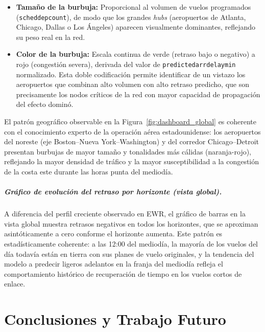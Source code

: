 \documentclass[12pt,oneside,a4paper]{report}
\renewcommand{\_}{\textunderscore\allowbreak}
\begin{document}
\begin{itemize}
    \item \textbf{Tamaño de la burbuja:} Proporcional al volumen de vuelos programados (\texttt{sched\_dep\_count}), de modo que los grandes \textit{hubs} (aeropuertos de Atlanta, Chicago, Dallas o Los Ángeles) aparecen visualmente dominantes, reflejando su peso real en la red.
    \item \textbf{Color de la burbuja:} Escala continua de verde (retraso bajo o negativo) a rojo (congestión severa), derivada del valor de \texttt{predicted\_arr\_delay\_min} normalizado. Esta doble codificación permite identificar de un vistazo los aeropuertos que combinan alto volumen con alto retraso predicho, que son precisamente los nodos críticos de la red con mayor capacidad de propagación del efecto dominó.
\end{itemize}

El patrón geográfico observable en la Figura~\ref{fig:dashboard_global} es coherente con el conocimiento experto de la operación aérea estadounidense: los aeropuertos del noreste (eje Boston--Nueva York--Washington) y del corredor Chicago--Detroit presentan burbujas de mayor tamaño y tonalidades más cálidas (naranja-rojo), reflejando la mayor densidad de tráfico y la mayor susceptibilidad a la congestión de la costa este durante las horas punta del mediodía.

\paragraph{Gráfico de evolución del retraso por horizonte (vista global).}
A diferencia del perfil creciente observado en EWR, el gráfico de barras en la vista global muestra retrasos negativos en todos los horizontes, que se aproximan asintóticamente a cero conforme el horizonte aumenta. Este patrón es estadísticamente coherente: a las 12:00 del mediodía, la mayoría de los vuelos del día todavía están en tierra con sus planes de vuelo originales, y la tendencia del modelo a predecir ligeros adelantos en la franja del mediodía refleja el comportamiento histórico de recuperación de tiempo en los vuelos cortos de enlace.


\chapter{Conclusiones y Trabajo Futuro}
\label{cap:conclusiones}
\end{document}
